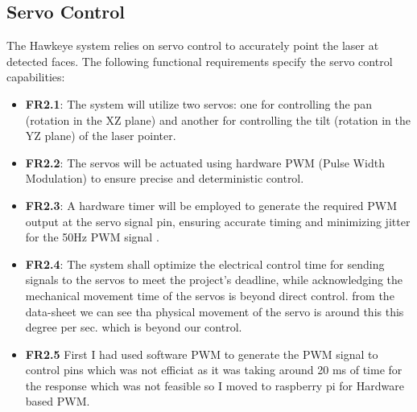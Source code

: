 \documentclass[a4paper,11pt]{article}%
\begin{document}
\subsection{Servo Control}
The Hawkeye system relies on servo control to accurately point the laser at detected faces. The following functional requirements specify the servo control capabilities:
\begin{itemize}
    \item \textbf{FR2.1}: The system will utilize two servos: one for controlling the pan (rotation in the XZ plane) and another for controlling the tilt (rotation in the YZ plane) of the laser pointer.
    \item \textbf{FR2.2}: The servos will be actuated using hardware PWM (Pulse Width Modulation) to ensure precise and deterministic control.
    \item \textbf{FR2.3}: A hardware timer will be employed to generate the required PWM output at the servo signal pin, ensuring accurate timing and minimizing jitter for the 50Hz PWM signal .
    \item \textbf{FR2.4}: The system shall optimize the electrical control time for sending signals to the servos to meet the project's deadline, while acknowledging the mechanical movement time of the servos is beyond direct control. from the data-sheet we can see tha physical movement of the servo is around this this degree per sec. which is beyond our control.
    \item \textbf{FR2.5} First I had used software PWM to generate the PWM signal to control pins which was not efficiat as it was taking around 20 ms of time for the response which was not feasible so I moved to raspberry pi for Hardware based PWM.
\end{itemize}
\end{document}
